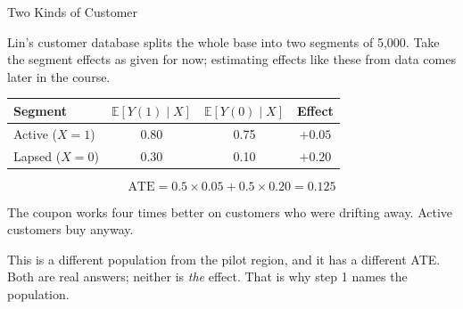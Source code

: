 \documentclass[aspectratio=169, 11pt, handout]{beamer}
\newcommand{\E}{\mathbb{E}}
\newcommand{\ATE}{\text{ATE}}
\begin{document}
\begin{frame}{Two Kinds of Customer}

Lin's customer database splits the whole base into two segments of 5{,}000. Take the segment effects as given for now; estimating effects like these from data comes later in the course.

\bigskip

\begin{center}
\begin{tabular}{lccc}
\toprule
\textbf{Segment} & $\E[Y(1) \mid X]$ & $\E[Y(0) \mid X]$ & \textbf{Effect} \\
\midrule
Active ($X = 1$) & 0.80 & 0.75 & $+0.05$ \\
Lapsed ($X = 0$) & 0.30 & 0.10 & $+0.20$ \\
\bottomrule
\end{tabular}
\end{center}

\[
\ATE = 0.5 \times 0.05 + 0.5 \times 0.20 = \mathbf{0.125}
\]

The coupon works four times better on customers who were drifting away. Active customers buy anyway.

\bigskip

\small This is a different population from the pilot region, and it has a different ATE. Both are real answers; neither is \emph{the} effect. That is why step 1 names the population.
\end{frame}
\end{document}
